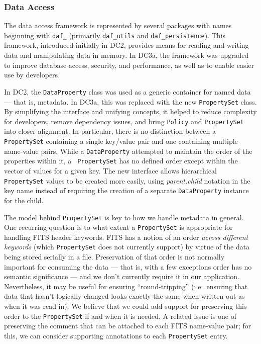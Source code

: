 
\subsubsection{Data Access}

The data access framework is represented by several packages with
names beginning with \texttt{daf\_} (primarily \texttt{daf\_utils}
and \texttt{daf\_persistence}).  This framework, introduced initially
in DC2, provides means for reading and writing data and manipulating
data in memory.  In DC3a, the framework was upgraded to improve
database access, security, and performance, as well as to enable easier
use by developers.  

In DC2, the {\tt DataProperty} class was used as a generic container
for named data --- that is, metadata.  In DC3a, this was replaced with
the new {\tt PropertySet} class.  By simplifying the interface and
unifying concepts, it helped to reduce complexity for developers,
remove dependency issues, and bring {\tt Policy} and {\tt PropertySet}
into closer alignment.  In particular, there is no distinction between
a {\tt PropertySet} containing a single key/value pair and one
containing multiple name-value pairs.  While a {\tt DataProperty}
attempted to maintain the order of the properties within it, a {\tt
PropertySet} has no defined order except within the vector of values
for a given key.  The new interface allows hierarchical {\tt
PropertySet} values to be created more easily, using \textit{parent.child}
notation in the key name instead of requiring the creation of a
separate {\tt DataProperty} instance for the child.  

The model behind {\tt PropertySet} is key to how we handle metadata in
general.  One recurring question is to what extent a {\tt PropertySet}
is appropriate for handling FITS header keywords.  FITS has a notion
of an order {\it across different keywords} (which {\tt PropertySet} does not
currently support) by virtue of the data being stored serially in a
file.  Preservation of that order is not normally important for
consuming the data --- that is, with a few exceptions order has no
semantic significance --- and we don't currently require it in our
application.  Nevertheless, it may be useful for ensuring
``round-tripping'' (i.e.\ ensuring that data that hasn't logically
changed looks exactly the same when written out as when it was read
in).  We believe that we could add support for preserving this order
to the {\tt PropertySet} if and when it is needed.   A related issue
is one of preserving the comment that can be attached to each FITS
name-value pair; for this, we can consider supporting annotations to
each {\tt PropertySet} entry.  

